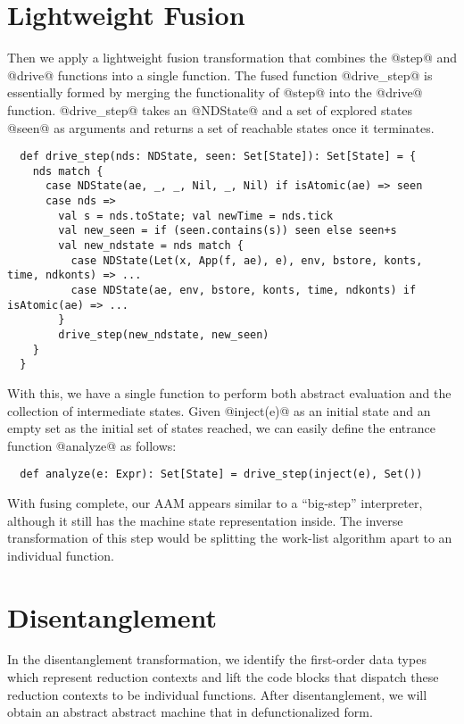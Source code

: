 \documentclass[acmsmall, review]{acmart}\settopmatter{}
\begin{document}
\section{Lightweight Fusion} \label{fusing}

Then we apply a lightweight fusion transformation that combines the @step@ and @drive@
functions into a single function.
The fused function @drive_step@ is essentially formed by merging the functionality of
@step@ into the @drive@ function.
@drive_step@ takes an @NDState@ and a set of explored states @seen@ as arguments
and returns a set of reachable states once it terminates.

\begin{lstlisting}
  def drive_step(nds: NDState, seen: Set[State]): Set[State] = {
    nds match {
      case NDState(ae, _, _, Nil, _, Nil) if isAtomic(ae) => seen
      case nds =>
        val s = nds.toState; val newTime = nds.tick
        val new_seen = if (seen.contains(s)) seen else seen+s
        val new_ndstate = nds match {
          case NDState(Let(x, App(f, ae), e), env, bstore, konts, time, ndkonts) => ...
          case NDState(ae, env, bstore, konts, time, ndkonts) if isAtomic(ae) => ...
        }
        drive_step(new_ndstate, new_seen)
    }
  }
\end{lstlisting}

With this, we have a single function to perform both abstract evaluation and the collection of
intermediate states. Given @inject(e)@ as an initial state and an empty set as the
initial set of states reached, we can easily define the entrance function @analyze@ as
follows:

\begin{lstlisting}
  def analyze(e: Expr): Set[State] = drive_step(inject(e), Set())
\end{lstlisting}

With fusing complete, our AAM appears similar to a ``big-step'' interpreter, although it
still has the machine state representation inside. The inverse transformation of this step
would be splitting the work-list algorithm apart to an individual function.

\section{Disentanglement} \label{disen}

In the disentanglement transformation, we identify the first-order data types which represent 
reduction contexts and lift the code blocks that dispatch these reduction contexts to be individual 
functions.
After disentanglement, we will obtain an abstract abstract machine that in defunctionalized form.
\end{document}
